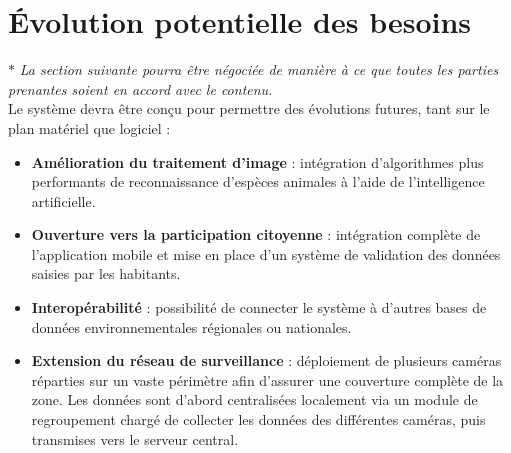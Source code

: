 \section{Évolution potentielle des besoins}

$ \ast $ \textit{La section suivante pourra être négociée de manière à ce que toutes les parties prenantes soient en accord avec le contenu.} \\

Le système devra être conçu pour permettre des évolutions futures, tant sur le plan matériel que logiciel :


\begin{itemize}
   \item \textbf{Amélioration du traitement d’image} : intégration d’algorithmes plus performants de reconnaissance d’espèces animales à l’aide de l’intelligence artificielle.
   \item \textbf{Ouverture vers la participation citoyenne} : intégration complète de l’application mobile et mise en place d’un système de validation des données saisies par les habitants.
   \item \textbf{Interopérabilité} : possibilité de connecter le système à d’autres bases de données environnementales régionales ou nationales.
   \item \textbf{Extension du réseau de surveillance} : déploiement de plusieurs caméras réparties sur un vaste périmètre afin d’assurer une couverture complète de la zone. Les données sont d’abord centralisées localement via un module de regroupement chargé de collecter les données des différentes caméras, puis transmises vers le serveur central.
\end{itemize}